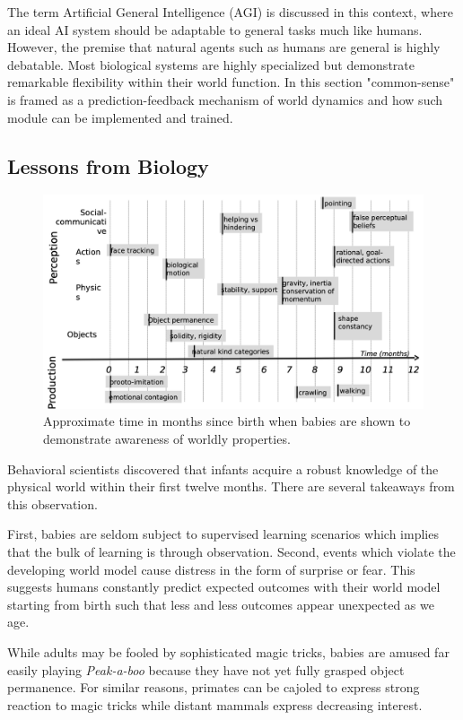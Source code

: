 The term Artificial General Intelligence (AGI) is discussed in this context, where an ideal AI system should be adaptable to general tasks much like humans. However, the premise that natural agents such as humans are general is highly debatable. Most biological systems are highly specialized but demonstrate remarkable flexibility within their world function. In this section "common-sense" is framed as a prediction-feedback mechanism of world dynamics and how such module can be implemented and trained.

\subsection{Lessons from Biology}

\begin{figure}
\includegraphics[width=\linewidth]{figs/baby.png}
\centering
\caption{Approximate time in months since birth when babies are shown to demonstrate awareness of worldly properties.}
\label{fig:baby}
\end{figure}

Behavioral scientists discovered that infants acquire a robust knowledge of the physical world within their first twelve months. 
There are several takeaways from this observation. 

First, babies are seldom subject to supervised learning scenarios which implies that the bulk of learning is through observation. 
Second, events which violate the developing world model cause distress in the form of surprise or fear. 
This suggests humans constantly predict expected outcomes with their world model starting from birth such that less and less outcomes appear unexpected as we age. 

While adults may be fooled by sophisticated magic tricks, babies are amused far easily playing \textit{Peak-a-boo} because they have not yet fully grasped object permanence. For similar reasons, primates can be cajoled to express strong reaction to magic tricks while distant mammals express decreasing interest.

